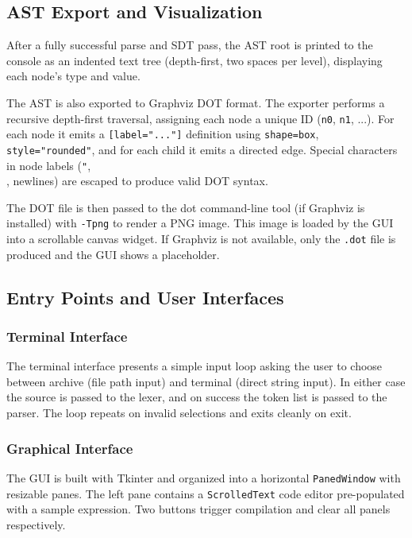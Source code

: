 \documentclass[letterpaper,12pt,oneside]{article}
\begin{document}
\subsection{AST Export and Visualization}
After a fully successful parse and SDT pass, the AST root is printed to the console as an indented text tree (depth-first, two spaces per level), displaying each node's type and value.

The AST is also exported to Graphviz DOT format. The exporter performs a recursive depth-first traversal, assigning each node a unique ID (\texttt{n0}, \texttt{n1}, ...). For each node it emits a \texttt{[label="..."]} definition using \texttt{shape=box}, \texttt{style="rounded"}, and for each child it emits a directed edge. Special characters in node labels (\texttt{"}, \texttt{\\}, newlines) are escaped to produce valid DOT syntax.

The DOT file is then passed to the dot command-line tool (if Graphviz is installed) with \texttt{-Tpng} to render a PNG image. This image is loaded by the GUI into a scrollable canvas widget. If Graphviz is not available, only the \texttt{.dot} file is produced and the GUI shows a placeholder.

\subsection{Entry Points and User Interfaces}

\subsubsection{Terminal Interface}
The terminal interface presents a simple input loop asking the user to choose between archive (file path input) and terminal (direct string input). In either case the source is passed to the lexer, and on success the token list is passed to the parser. The loop repeats on invalid selections and exits cleanly on exit.

\subsubsection{Graphical Interface}
The GUI is built with Tkinter and organized into a horizontal \texttt{PanedWindow} with resizable panes. The left pane contains a \texttt{ScrolledText} code editor pre-populated with a sample expression. Two buttons trigger compilation and clear all panels respectively.
\end{document}
